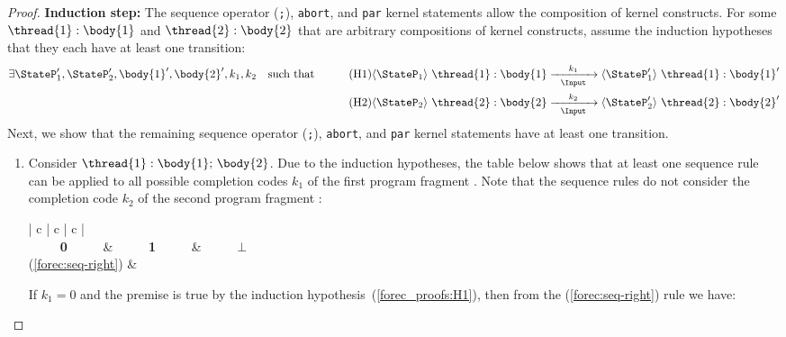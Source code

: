 \begin{proof}
	\textbf{Induction step:}
	The sequence operator (\verb$;$), \verb$abort$, and \verb$par$ 
	kernel statements allow the composition of kernel constructs.
	For some $\thread{1}:\body{1}$ and $\thread{2}:\body{2}$ that 
	are arbitrary compositions of kernel constructs, assume the induction hypotheses 
	that they each have at least one transition:
	\begin{align*}
		\exists \StateP_1', \StateP_2', \body{1}', \body{2}', k_1, k_2
		\quad \text{such that} \quad
		\tag{H1}
		\label{forec_proofs:H1}
		\langle \StateP_1 \rangle ~ \thread{1}:\body{1}
		&	\xrightarrow[~~\Input~~]{k_1} 
		\langle \StateP_1' \rangle ~ \thread{1}:\body{1}'						\\
		\tag{H2}
		\label{forec_proofs:H2}
		\langle \StateP_2 \rangle ~ \thread{2}:\body{2}
		&	\xrightarrow[~~\Input~~]{k_2} 
		\langle \StateP_2' \rangle ~ \thread{2}:\body{2}'
	\end{align*}
	Next, we show that the remaining sequence operator (\verb$;$), 
	\verb$abort$, and \verb$par$ kernel statements have at least one transition.
	\begin{enumerate}
		\item Consider $\thread{1}: \body{1}\mathtt{;}~\body{2}$. 
			  Due to the induction hypotheses, the table below shows that at least one
			  sequence rule can be applied to all possible completion codes $k_1$
			  of the first program fragment . Note that the sequence rules
			  do not consider the completion code $k_2$ of the second program fragment 
			  :
			  \begin{center}
			  	\def\arraystretch{1.3}
				\begin{tabular}{| c | c | c |}
					\hline
															\\ 
					~~~~~\textbf{0}~~~~~	& ~~~~~\textbf{1}~~~~~	& ~~~~~\boldmath$\bot$~~~~~	\\ \hline 
					(\ref{forec:seq-right})	& 		\\
					\hline
				\end{tabular}
			  \end{center}
			  If $k_1 = 0$ and the premise is true by the induction 
			  hypothesis~(\ref{forec_proofs:H1}), then from the (\ref{forec:seq-right}) 
			  rule we have:
			  \begin{prooftree}

\end{prooftree}
\end{enumerate}
\end{proof}

